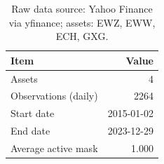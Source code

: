 \begin{table}[!htbp]
\centering
\caption{Data overview.}
\label{tab:data-overview}
\begin{tabular}{lr}
\toprule
Item & Value \\
\midrule
Assets & 4 \\
Observations (daily) & 2264 \\
Start date & 2015-01-02 \\
End date & 2023-12-29 \\
Average active mask & 1.000 \\
\bottomrule
\end{tabular}
\caption*{\footnotesize Raw data source: Yahoo Finance via yfinance; assets: EWZ, EWW, ECH, GXG.}
\end{table}
